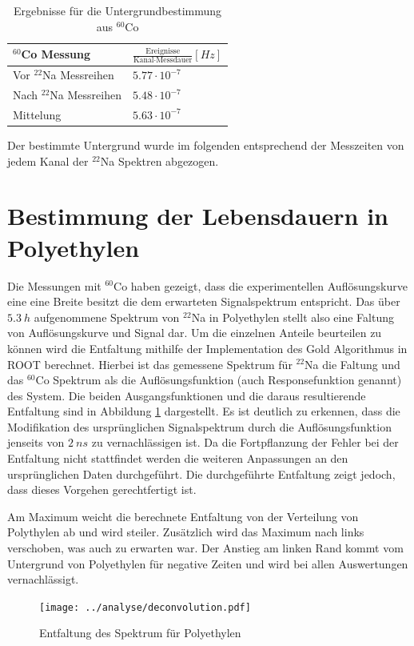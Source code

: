 \documentclass[a4paper,12pt]{article}
\begin{document}
 \begin{table}[h]
	\begin{tabular}{l |l }
		$^{60}$Co  Messung & $\frac{\text{Ereignisse}}{\text{Kanal} \cdot \text{Messdauer}} [\si{Hz}]$ \\
		\hline
		Vor $^{22}$Na Messreihen & $5.77 \cdot 10^{-7}$ \\
		Nach $^{22}$Na Messreihen &$ 5.48 \cdot 10^{-7}$\\
		\hline
		\hline
		Mittelung & $5.63 \cdot 10^{-7}$
	\end{tabular}
	\centering
	\caption{Ergebnisse für die Untergrundbestimmung aus $^{60}$Co}
	\label{tab:background}
\end{table}
 Der bestimmte Untergrund wurde im folgenden entsprechend der Messzeiten von jedem Kanal der
 $^{22}$Na Spektren abgezogen.
\section{Bestimmung der Lebensdauern in Polyethylen}\label{cap:poly}
Die Messungen mit $^{60}$Co haben gezeigt, dass die experimentellen Auflösungskurve eine eine Breite besitzt die dem erwarteten Signalspektrum entspricht.
Das über $\SI{5.3}{h}$ aufgenommene Spektrum von $^{22}$Na in Polyethylen
stellt also eine Faltung von Auflösungskurve und Signal dar. Um die einzelnen Anteile beurteilen zu
können wird die Entfaltung mithilfe der Implementation des Gold Algorithmus\cite{gold_algo} in
ROOT\cite{root} berechnet.
Hierbei ist das gemessene Spektrum für $^{22}$Na die Faltung und das $^{60}$Co Spektrum als die
Auflösungsfunktion (auch Responsefunktion genannt) des System.
Die beiden Ausgangsfunktionen und die daraus resultierende Entfaltung sind in Abbildung \ref{fig:deconvolution} dargestellt. Es ist deutlich zu erkennen, dass die
Modifikation des ursprünglichen Signalspektrum durch die Auflösungsfunktion jenseits von $\SI{2}{ns}$ zu vernachlässigen ist. Da die Fortpflanzung der Fehler bei
der Entfaltung nicht stattfindet werden die weiteren Anpassungen an den ursprünglichen Daten
durchgeführt. Die durchgeführte Entfaltung zeigt jedoch, dass dieses Vorgehen gerechtfertigt ist.

Am Maximum weicht die berechnete Entfaltung von der Verteilung von Polythylen ab und wird steiler.
Zusätzlich wird das Maximum nach links verschoben, was auch zu erwarten war.
Der Anstieg am linken Rand kommt vom Untergrund von Polyethylen für negative Zeiten und wird bei allen Auswertungen vernachlässigt.


\begin{figure}
	\texttt{[image: ../analyse/deconvolution.pdf]}
	\caption{Entfaltung des Spektrum für Polyethylen}
	\label{fig:deconvolution}
\end{figure}
\end{document}
